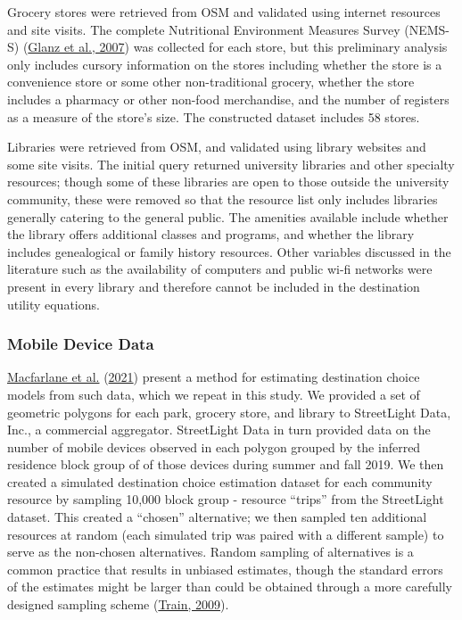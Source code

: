 \documentclass[3p, authoryear, review]{elsarticle} %
\begin{document}
Grocery stores were retrieved from OSM and validated using internet resources and
site visits. The complete Nutritional Environment Measures Survey (NEMS-S) (\protect\hyperlink{ref-glanz2007}{Glanz et al., 2007})
was collected for each store, but this preliminary analysis only includes
cursory information on the stores including whether the store is a convenience store
or some other non-traditional grocery, whether the store includes a pharmacy or
other non-food merchandise, and the number of registers as a measure of the
store's size. The constructed dataset includes 58 stores.

Libraries were retrieved from OSM, and validated using library websites and
some site visits. The initial query returned university libraries and other
specialty resources; though some of these libraries are open to those outside
the university community, these were removed so that the resource list only
includes libraries generally catering to the general public. The amenities
available include whether the library offers additional classes and programs,
and whether the library includes genealogical or family history resources.
Other variables discussed in the literature such as the availability of computers
and public wi-fi networks were present in every library and therefore cannot
be included in the destination utility equations.

\hypertarget{mobile-device-data}{%
\subsubsection{Mobile Device Data}\label{mobile-device-data}}

\protect\hyperlink{ref-alamedaparks}{Macfarlane et al.} (\protect\hyperlink{ref-alamedaparks}{2021}) present a method for estimating destination choice models from
such data, which we repeat in this study. We provided a set of geometric
polygons for each park, grocery store, and library to StreetLight Data, Inc., a
commercial aggregator. StreetLight Data in turn provided data on the number of
mobile devices observed in each polygon grouped by the inferred residence block
group of of those devices during summer and fall 2019.
We then created a simulated destination choice estimation dataset for each
community resource by sampling 10,000 block group - resource ``trips'' from the
StreetLight dataset. This created a ``chosen'' alternative; we then sampled ten additional
resources at random (each simulated trip was paired with a different sample) to
serve as the non-chosen alternatives. Random sampling of alternatives is a
common practice that results in unbiased estimates, though the standard errors
of the estimates might be larger than could be obtained through a more carefully
designed sampling scheme (\protect\hyperlink{ref-train2009}{Train, 2009}).
\end{document}
